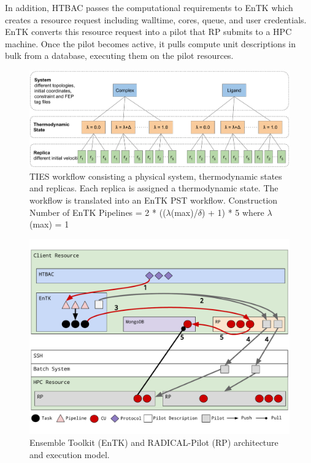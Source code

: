 In addition, HTBAC passes the computational
requirements to EnTK which creates a resource request including walltime, cores, 
queue, and user credentials. EnTK converts this resource request into a pilot 
that RP submits to a HPC machine. Once the pilot becomes active, it pulls 
compute unit descriptions in bulk from a database, executing them on the pilot 
resources. 


\begin{figure}
  \centering
   \includegraphics[width=\columnwidth]{figures/ties_workflow.pdf}
  \caption{TIES workflow consisting a physical system, thermodynamic states and 
  replicas. Each replica is assigned a thermodynamic state. The workflow is 
  translated into an EnTK PST workflow. Construction Number of EnTK 
  Pipelines = 2 * (($\lambda$(max)/$\delta$) + 1) * 5 where $\lambda$(max) = 1 }
\label{fig:ties_workflow}
\end{figure}

  
\begin{figure}
  \centering
   \includegraphics[width=\columnwidth]{figures/ht-bac-rp_integration.pdf}
  \caption{Ensemble Toolkit (EnTK) and RADICAL-Pilot (RP) architecture and 
  execution model.}
\label{fig:integration}
\end{figure}

